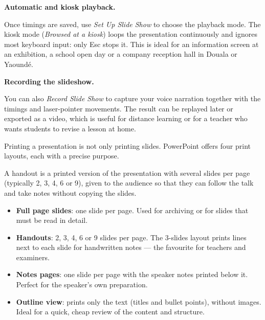 \documentclass[11pt]{article}
\newcommand{\cle}[1]{{\popxbold\color{popdark}#1}}
\newcounter{popsec}
\newcounter{popsub}
\newcommand{\courssub}[1]{%
  \stepcounter{popsub}%
  \par\vspace{9pt}\noindent{\popxbold\fontsize{11.5}{13}\selectfont\color{popink}{\color{poporange}\thepopsec.\thepopsub}\hspace{6pt}#1}\par\nopagebreak\vspace{4pt}
}
\begin{document}
\textbf{Automatic and kiosk playback.}\par
Once timings are saved, use \emph{Set Up Slide Show} to choose the playback mode. The \cle{kiosk mode} (\emph{Browsed at a kiosk}) loops the presentation continuously and ignores most keyboard input: only Esc stops it. This is ideal for an information screen at an exhibition, a school open day or a company reception hall in Douala or Yaoundé.

\textbf{Recording the slideshow.}\par
You can also \emph{Record Slide Show} to capture your voice narration together with the timings and laser-pointer movements. The result can be replayed later or exported as a video, which is useful for distance learning or for a teacher who wants students to revise a lesson at home.

\courssub{Printing the Presentation}

Printing a presentation is not only printing slides. PowerPoint offers four \cle{print layouts}, each with a precise purpose.

\begin{definition}[Handout]
A \cle{handout} is a printed version of the presentation with several slides per page (typically 2, 3, 4, 6 or 9), given to the audience so that they can follow the talk and take notes without copying the slides.
\end{definition}

\begin{itemize}
\item \textbf{Full page slides}: one slide per page. Used for archiving or for slides that must be read in detail.
\item \textbf{Handouts}: 2, 3, 4, 6 or 9 slides per page. The 3-slides layout prints lines next to each slide for handwritten notes --- the favourite for teachers and examiners.
\item \textbf{Notes pages}: one slide per page with the speaker notes printed below it. Perfect for the speaker's own preparation.
\item \textbf{Outline view}: prints only the text (titles and bullet points), without images. Ideal for a quick, cheap review of the content and structure.
\end{itemize}
\end{document}
